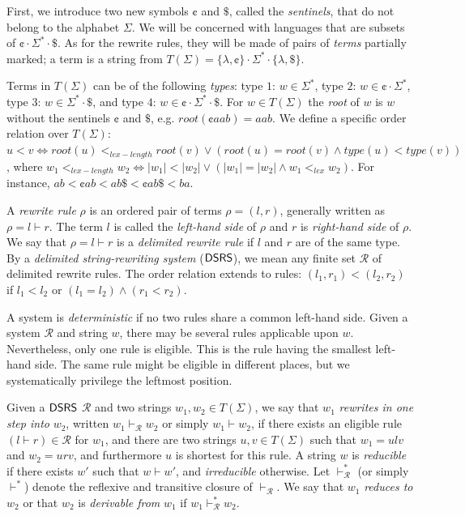 First, we introduce two new symbols $\cent$ and $\$$, called the \emph{sentinels}, that do not belong to the alphabet $\Sigma$. We will be concerned with languages that are subsets of $\cent \cdot \Sigma^* \cdot \$$. As for the rewrite rules, they will be made of pairs of \emph{terms} partially marked; a term is a string from $T(\Sigma) = \{\lambda, \cent\} \cdot \Sigma^* \cdot \{\lambda, \$\}$.

Terms in $T(\Sigma)$ can be of the following \emph{types}: type $1$: $w \in \Sigma^*$, type $2$: $w \in \cent \cdot \Sigma^*$, type $3$: $w \in \Sigma^* \cdot \$$, and type $4$: $w \in \cent \cdot \Sigma^* \cdot \$$. For $w \in T(\Sigma)$ the \emph{root} of $w$ is $w$ without the sentinels $\cent$ and $\$$, e.g. $root(\cent aab) = aab$. We define a specific order relation over $T(\Sigma)$: $u < v \Leftrightarrow root(u) <_{lex-length} root(v) \vee (root(u) = root(v) \wedge type(u) < type(v))$, where $w_1 <_{lex-length} w_2 \Leftrightarrow |w_1| < |w_2| \vee (|w_1| = |w_2| \wedge w_1 <_{lex} w_2)$. For instance, $ab < \cent ab < ab \$ < \cent ab \$ < ba$.

A \emph{rewrite rule} $\rho$ is an ordered pair of terms $\rho = (l, r)$, generally written as $\rho = l \vdash r$. The term $l$ is called the \emph{left-hand side} of $\rho$ and $r$ is \emph{right-hand side} of $\rho$. We say that $\rho = l \vdash r$ is a \emph{delimited rewrite rule} if $l$ and $r$ are of the same type. By a \emph{delimited string-rewriting system} ($\mbox{\sf DSRS}$), we mean any finite set $\mathcal{R}$ of delimited rewrite rules. The order relation extends to rules: $(l_1, r_1) < (l_2, r_2)$ if $l_1 < l_2$ or $(l_1 = l_2) \wedge (r_1 < r_2)$.

A system is \emph{deterministic} if no two rules share a common left-hand side. Given a system $\mathcal{R}$ and string $w$, there may be several rules applicable upon $w$. Nevertheless, only one rule is eligible. This is the rule having the smallest left-hand side. The same rule might be eligible in different places, but we systematically privilege the leftmost position.

Given a $\mbox{\sf DSRS}$ $\mathcal{R}$ and two strings $w_1, w_2 \in T(\Sigma)$, we say that $w_1$ \emph{rewrites in one step into} $w_2$, written $w_1 \vdash_{\mathcal{R}} w_2$ or simply $w_1 \vdash w_2$, if there exists an eligible rule $(l \vdash r) \in \mathcal{R}$ for $w_1$, and there are two strings $u, v \in T(\Sigma)$ such that $w_1 = ulv$ and $w_2 = urv$, and furthermore $u$ is shortest for this rule. A string $w$ is \emph{reducible} if there exists $w'$ such that $w \vdash w'$, and \emph{irreducible} otherwise. Let $\vdash_{\mathcal{R}}^* $ (or simply $\vdash^*$) denote the reflexive and transitive closure of $\vdash_{\mathcal{R}}$. We say that $w_1$ \emph{reduces to} $w_2$ or that $w_2$ is \emph{derivable from} $w_1$ if $w_1 \vdash_{\mathcal{R}}^* w_2$.


